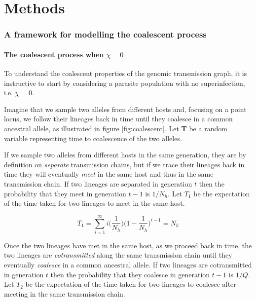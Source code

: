 \documentclass[_main.tex]{subfiles}
\begin{document}
\part*{Methods}
\label{supp_methods}

\section{A framework for modelling the coalescent process}

\subsection{The coalescent process when $\chi = 0$}
\label{supp_coal_chi_zero}

To understand the coalescent properties of the genomic transmission graph, it is instructive to start by considering a parasite population with no superinfection, i.e. $\chi =0$.

Imagine that we sample two alleles from different hosts and, focusing on a point locus, we follow their lineages back in time until they coalesce in a common ancestral allele, as illustrated in figure \ref{fig:coalescent}.  Let \textbf{T} be a random variable representing time to coalescence of the two alleles.

If we sample two alleles from different hosts in the same generation, they are by definition on \textit{separate} transmission chains, but if we trace their lineages back in time they will eventually \textit{meet} in the same host and thus in the same transmission chain.  If two lineages are separated in generation $t$ then the probability that they meet in generation $t-1$ is $1/N_h$.   Let $T_1$ be the expectation of the time taken for two lineages to meet in the same host.

\begin{equation*}
T_1 = 
\sum_{i=1}^\infty
i \Big( \frac{1}{N_h} \Big)
\Big( 1 - \frac{1}{N_h} \Big)^{i-1}
 = N_h
\end{equation*}

Once the two lineages have met in the same host, as we proceed back in time, the two lineages are \textit{cotransmitted} along the same transmission chain until they eventually \textit{coalesce} in a common ancestral allele.  If two lineages are cotransmitted in generation $t$ then the probability that they coalesce in generation $t-1$ is $1/Q$.  Let $T_2$ be the expectation of the time taken for two lineages to coalesce after meeting in the same transmission chain.
\end{document}
